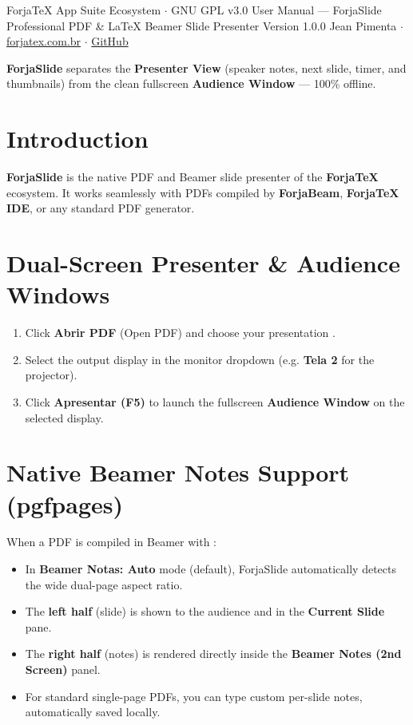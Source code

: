 \documentclass[11pt,a4paper]{article}
\begin{document}
  {ForjaTeX App Suite Ecosystem $\cdot$ GNU GPL v3.0}
  {User Manual --- ForjaSlide}
  {Professional PDF \& \LaTeX{} Beamer Slide Presenter}
  {Version 1.0.0}
  {Jean Pimenta $\cdot$ \href{https://forjatex.com.br}{\color{fjsky}forjatex.com.br} $\cdot$ \href{https://github.com/jeanjpimenta/forjatex-suite}{\color{fjsky}GitHub}}


\begin{fjcallout}
\textbf{ForjaSlide} separates the \textbf{Presenter View} (speaker notes, next slide, timer, and thumbnails) from the clean fullscreen \textbf{Audience Window} --- 100\% offline.
\end{fjcallout}

\section{Introduction}
\textbf{ForjaSlide} is the native PDF and Beamer slide presenter of the \textbf{ForjaTeX} ecosystem. It works seamlessly with PDFs compiled by \textbf{ForjaBeam}, \textbf{ForjaTeX IDE}, or any standard PDF generator.

\section{Dual-Screen Presenter & Audience Windows}
\begin{enumerate}
  \item Click \textbf{Abrir PDF} (Open PDF) and choose your presentation .
  \item Select the output display in the monitor dropdown (e.g. \textbf{Tela 2} for the projector).
  \item Click \textbf{Apresentar (F5)} to launch the fullscreen \textbf{Audience Window} on the selected display.
\end{enumerate}

\section{Native Beamer Notes Support (pgfpages)}
When a PDF is compiled in Beamer with :
\begin{itemize}
  \item In \textbf{Beamer Notas: Auto} mode (default), ForjaSlide automatically detects the wide dual-page aspect ratio.
  \item The \textbf{left half} (slide) is shown to the audience and in the \textbf{Current Slide} pane.
  \item The \textbf{right half} (notes) is rendered directly inside the \textbf{Beamer Notes (2nd Screen)} panel.
  \item For standard single-page PDFs, you can type custom per-slide notes, automatically saved locally.
\end{itemize}
\end{document}
